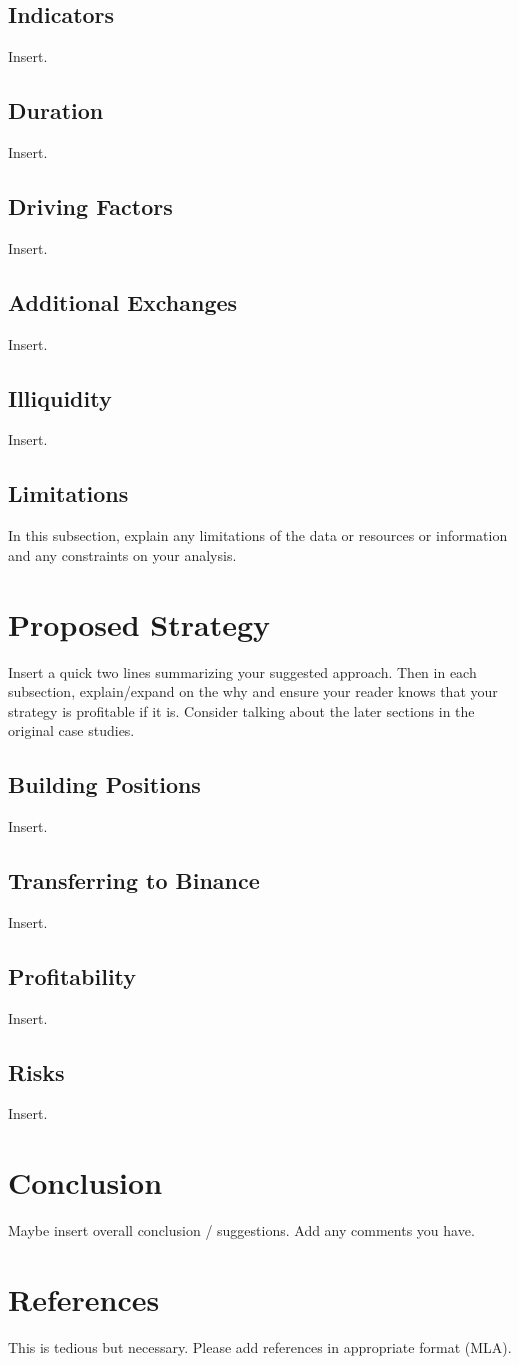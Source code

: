 \documentclass{article}
\begin{document}
\subsection{Indicators}
Insert.
\subsection{Duration}
Insert.
\subsection{Driving Factors}
Insert.
\subsection{Additional Exchanges}
Insert.
\subsection{Illiquidity}
Insert.
\subsection{Limitations}
In this subsection, explain any limitations of the data or resources or information and any constraints on your analysis.

\section{Proposed Strategy}
Insert a quick two lines summarizing your suggested approach. Then in each subsection, explain/expand on the why and ensure your reader knows that your strategy is profitable if it is. Consider talking about the later sections in the original case studies.
\subsection{Building Positions}
Insert.
\subsection{Transferring to Binance}
Insert.
\subsection{Profitability}
Insert.
\subsection{Risks}
Insert.

\section{Conclusion}
Maybe insert overall conclusion / suggestions. Add any comments you have.

\section{References}
This is tedious but necessary. Please add references in appropriate format (MLA).
\end{document}
